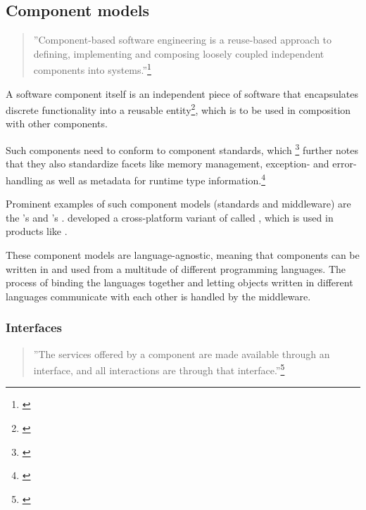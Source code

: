 \subsection{Component models}
\label{sec:ComponentModels}

\begin{quotation}
''Component-based software engineering is a reuse-based approach to defining, implementing and composing loosely coupled independent components into systems.''\footnote{\citep[460]{Sommerville}}
\end{quotation}

A software component itself is an independent piece of software that encapsulates discrete functionality into a reusable entity\footnote{\citep[3]{ComponentTechnology}}, which is to be used in composition with other components.

Such components need to conform to component standards, which \footnote{\citep[440]{Sommerville}}  further notes that they also standardize facets like memory management, exception- and error-handling as well as metadata for runtime type information.\footnote{\citep[8]{ComponentTechnology}}

Prominent examples of such component models (standards and middleware) are the 's  and 's .  developed a cross-platform variant of  called , which is used in products like .

These component models are language-agnostic, meaning that components can be written in and used from a multitude of different programming languages. The process of binding the languages together and letting objects written in different languages communicate with each other is handled by the middleware.

\subsubsection{Interfaces}

\begin{quotation}
''The services offered by a component are made available through an interface, and all interactions are through that interface.''\footnote{\citep[444]{Sommerville}}
\end{quotation}

